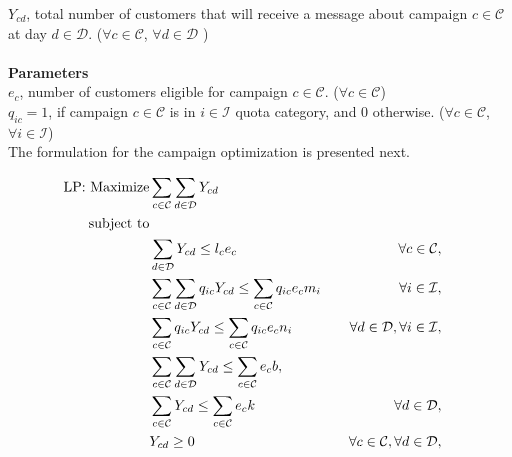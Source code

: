 \documentclass[11pt]{article}
\begin{document}
\noindent $Y_{{c}{d}}$, total number of customers that will receive a message about campaign $c \in \mathcal{C}$ at day $d \in \mathcal{D}$.
($\forall c \in \mathcal{C}$, $\forall d \in \mathcal{D}$ )\\
\\

\noindent \textbf{Parameters}\\

\noindent $e_{c}$, number of customers eligible for campaign $c \in \mathcal{C}$.
($\forall c \in \mathcal{C}$)\\

\noindent $q_{{i}{c}}=1$, if campaign $c \in \mathcal{C}$ is in $i \in \mathcal{I}$ quota category, and 0 otherwise.
($\forall c \in \mathcal{C}$, $\forall i \in \mathcal{I}$)\\

\noindent The formulation for the campaign optimization is presented next.

\begin{align}
\text{LP: }\text{Maximize} & \displaystyle
\sum\limits_{c\in \mathcal{C}}
\sum\limits_{d\in \mathcal{D}}
Y_{{c}{d}} \label{mathmodel2_obj}&
\\
\text{subject to} \notag\\
&\sum\limits_{d\in\mathcal{D}}Y_{{c}{d}} \leq l_{c}  e_{c} &&&\forall c \in \mathcal{C}, \label{mathmodel2_campaignlimit}&\\
&\sum\limits_{c\in\mathcal{C}}\sum\limits_{d\in\mathcal{D}} q_{{i}{c}} Y_{{c}{d}}\leq \sum\limits_{c\in\mathcal{C}}q_{{i}{c}} e_{c}  m_{i} &&&\forall i \in \mathcal{I}, \label{mathmodel2_weeklyquotalimit}&\\
&\sum\limits_{c\in\mathcal{C}}q_{{i}{c}} Y_{{c}{d}} \leq \sum\limits_{c\in\mathcal{C}}q_{{i}{c}} e_{c} n_{i} &&&\forall d \in \mathcal{D}, \forall i \in \mathcal{I}, \label{mathmodel2_dailyquotalimit}&\\
&\sum\limits_{c\in\mathcal{C}}\sum\limits_{d\in\mathcal{D}}Y_{{c}{d}} \leq \sum\limits_{c\in\mathcal{C}}e_{c}  b, \label{mathmodel2_weeklylimit}&\\
&\sum\limits_{c\in\mathcal{C}}Y_{{c}{d}} \leq \sum\limits_{c\in\mathcal{C}}e_{c} k &&&\forall d \in \mathcal{D},\label{mathmodel2_dailylimit}&\\
&Y_{{c}{d}} \geq 0&&&\forall c \in \mathcal{C}, \forall d \in \mathcal{D}, \label{mathmodel2_positive}
\end{align}\\
\end{document}
